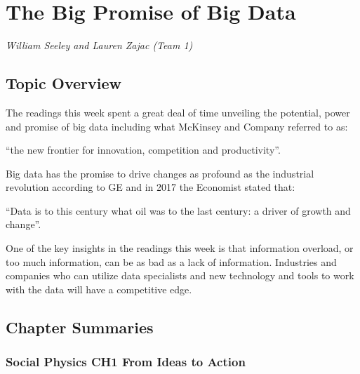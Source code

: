 \documentclass[]{book}
\begin{document}
\hypertarget{the-big-promise-of-big-data}{%
\chapter{The Big Promise of Big Data}\label{the-big-promise-of-big-data}}

\emph{William Seeley and Lauren Zajac (Team 1)}

\hypertarget{topic-overview}{%
\section{Topic Overview}\label{topic-overview}}

The readings this week spent a great deal of time unveiling the potential, power and promise of big data including
what McKinsey and Company referred to as:

``the new frontier for innovation, competition and productivity''.

Big data has the promise to drive changes as profound as the industrial revolution according to GE and in 2017 the Economist
stated that:

``Data is to this century what oil was to the last century: a driver of growth and change''.

One of the key insights in the readings this week is that information overload, or too much information, can be as bad as a lack of information. Industries and companies who can utilize data specialists and new technology and tools to work with the data will have a
competitive edge.

\hypertarget{chapter-summaries}{%
\section{Chapter Summaries}\label{chapter-summaries}}

\hypertarget{social-physics-ch1-from-ideas-to-action}{%
\subsection{\texorpdfstring{Social Physics \textbf{CH1 From Ideas to Action}}{Social Physics CH1 From Ideas to Action}}\label{social-physics-ch1-from-ideas-to-action}}
\end{document}
